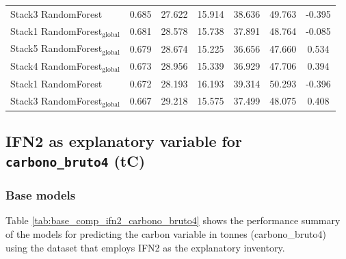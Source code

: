 \begin{table}[tp]
{\begin{tabular}{p{4.5cm}cccccc}
        Stack3 RandomForest & 0.685 & 27.622 & 15.914 & 38.636 & 49.763 & -0.395 \\
        Stack1 RandomForest$_{\text{global}}$ & 0.681 & 28.578 & 15.738 & 37.891 & 48.764 & -0.085 \\
        Stack5 RandomForest$_{\text{global}}$ & 0.679 & 28.674 & 15.225 & 36.656 & 47.660 & 0.534 \\
        Stack4 RandomForest$_{\text{global}}$ & 0.673 & 28.956 & 15.339 & 36.929 & 47.706 & 0.394 \\
        Stack1 RandomForest & 0.672 & 28.193 & 16.193 & 39.314 & 50.293 & -0.396 \\
        Stack3 RandomForest$_{\text{global}}$ & 0.667 & 29.218 & 15.575 & 37.499 & 48.075 & 0.408 \\
            \bottomrule
    \end{tabular}
    }
\end{table}


\clearpage
\subsection{IFN2 as explanatory variable for \texttt{carbono\_bruto4} (tC)}

\subsubsection{Base models}

Table \ref{tab:base_comp_ifn2_carbono_bruto4} shows the performance summary of the models for predicting the carbon variable in tonnes (carbono\_bruto4) using the dataset that employs IFN2 as the explanatory inventory.

